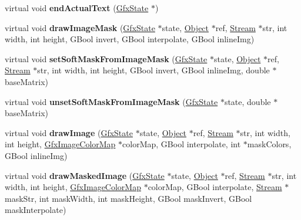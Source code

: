 \begin{DoxyCompactItemize}
\mbox{\label{class_output_dev_a23f812adafca46e599ec0f7290534127}} 
virtual void {\bfseries end\+Actual\+Text} (\hyperlink{class_gfx_state}{Gfx\+State} $\ast$)
\item 
\mbox{\label{class_output_dev_a630a960bf7cfada13e56c968c2be041d}} 
virtual void {\bfseries draw\+Image\+Mask} (\hyperlink{class_gfx_state}{Gfx\+State} $\ast$state, \hyperlink{class_object}{Object} $\ast$ref, \hyperlink{class_stream}{Stream} $\ast$str, int width, int height, G\+Bool invert, G\+Bool interpolate, G\+Bool inline\+Img)
\item 
\mbox{\label{class_output_dev_a2e26e4b8a43b55575b36139728ed6542}} 
virtual void {\bfseries set\+Soft\+Mask\+From\+Image\+Mask} (\hyperlink{class_gfx_state}{Gfx\+State} $\ast$state, \hyperlink{class_object}{Object} $\ast$ref, \hyperlink{class_stream}{Stream} $\ast$str, int width, int height, G\+Bool invert, G\+Bool inline\+Img, double $\ast$base\+Matrix)
\item 
\mbox{\label{class_output_dev_ab26abaccd671a63425c64e3192567b27}} 
virtual void {\bfseries unset\+Soft\+Mask\+From\+Image\+Mask} (\hyperlink{class_gfx_state}{Gfx\+State} $\ast$state, double $\ast$base\+Matrix)
\item 
\mbox{\label{class_output_dev_a5faa216a4d6de3e7a372abb0318085e2}} 
virtual void {\bfseries draw\+Image} (\hyperlink{class_gfx_state}{Gfx\+State} $\ast$state, \hyperlink{class_object}{Object} $\ast$ref, \hyperlink{class_stream}{Stream} $\ast$str, int width, int height, \hyperlink{class_gfx_image_color_map}{Gfx\+Image\+Color\+Map} $\ast$color\+Map, G\+Bool interpolate, int $\ast$mask\+Colors, G\+Bool inline\+Img)
\item 
\mbox{\label{class_output_dev_a9da1d31676bdac51fb98da1281e2863d}} 
virtual void {\bfseries draw\+Masked\+Image} (\hyperlink{class_gfx_state}{Gfx\+State} $\ast$state, \hyperlink{class_object}{Object} $\ast$ref, \hyperlink{class_stream}{Stream} $\ast$str, int width, int height, \hyperlink{class_gfx_image_color_map}{Gfx\+Image\+Color\+Map} $\ast$color\+Map, G\+Bool interpolate, \hyperlink{class_stream}{Stream} $\ast$mask\+Str, int mask\+Width, int mask\+Height, G\+Bool mask\+Invert, G\+Bool mask\+Interpolate)

\end{DoxyCompactItemize}
